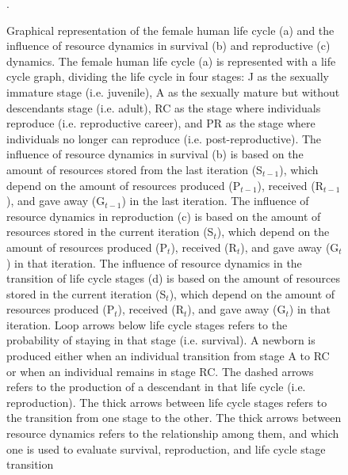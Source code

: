 \documentclass{article}
\begin{document}
\begin{figure}[H]
\caption{Graphical representation of the female human life cycle (a) and the influence of resource dynamics in survival (b) and reproductive (c) dynamics. The female human life cycle (a) is represented with a life cycle graph, dividing the life cycle in four stages: J as the sexually immature stage (i.e. juvenile), A as the sexually mature but without descendants stage (i.e. adult), RC as the stage where individuals reproduce (i.e. reproductive career), and PR as the stage where individuals no longer can reproduce (i.e. post-reproductive). The influence of resource dynamics in survival (b) is based on the amount of resources stored from the last iteration (S$_{t-1}$), which depend on the amount of resources produced (P$_{t-1}$), received (R$_{t-1}$), and gave away (G$_{t-1}$) in the last iteration. The influence of resource dynamics in reproduction (c) is based on the amount of resources stored in the current iteration (S$_t$), which depend on the amount of resources produced (P$_{t}$), received (R$_{t}$), and gave away (G$_{t}$) in that iteration. The influence of resource dynamics in the transition of life cycle stages (d) is based on the amount of resources stored in the current iteration (S$_t$), which depend on the amount of resources produced (P$_{t}$), received (R$_{t}$), and gave away (G$_{t}$) in that iteration. Loop arrows below life cycle stages refers to the probability of staying in that stage (i.e. survival). A newborn is produced either when an individual transition from stage A to RC or when an individual remains in stage RC. The dashed arrows refers to the production of a descendant in that life cycle (i.e. reproduction). The thick arrows between life cycle stages refers to the transition from one stage to the other. The thick arrows between resource dynamics refers to the relationship among them, and which one is used to evaluate survival, reproduction, and life cycle stage transition}.
    \label{fig:1}
\end{figure}

\clearpage



\end{document}
